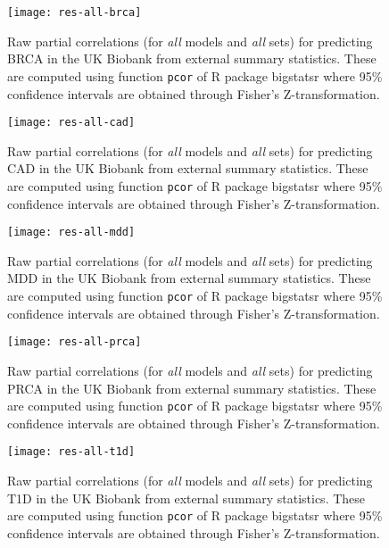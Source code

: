 \begin{figure}[p]
	\centerline{\texttt{[image: res-all-brca]}}
	\caption{Raw partial correlations (for \textit{all} models and \textit{all} sets) for predicting BRCA in the UK Biobank from external summary statistics. These are computed using function \texttt{pcor} of R package bigstatsr where 95\% confidence intervals are obtained through Fisher's Z-transformation.}
	\label{fig:res_brca_all}
\end{figure}

\begin{figure}[p]
	\centerline{\texttt{[image: res-all-cad]}}
	\caption{Raw partial correlations (for \textit{all} models and \textit{all} sets) for predicting CAD in the UK Biobank from external summary statistics. These are computed using function \texttt{pcor} of R package bigstatsr where 95\% confidence intervals are obtained through Fisher's Z-transformation.}
	\label{fig:res_cad_all}
\end{figure}

\begin{figure}[p]
	\centerline{\texttt{[image: res-all-mdd]}}
	\caption{Raw partial correlations (for \textit{all} models and \textit{all} sets) for predicting MDD in the UK Biobank from external summary statistics. These are computed using function \texttt{pcor} of R package bigstatsr where 95\% confidence intervals are obtained through Fisher's Z-transformation.}
	\label{fig:res_mdd_all}
\end{figure}

\begin{figure}[p]
	\centerline{\texttt{[image: res-all-prca]}}
	\caption{Raw partial correlations (for \textit{all} models and \textit{all} sets) for predicting PRCA in the UK Biobank from external summary statistics. These are computed using function \texttt{pcor} of R package bigstatsr where 95\% confidence intervals are obtained through Fisher's Z-transformation.}
	\label{fig:res_prca_all}
\end{figure}

\begin{figure}[p]
	\centerline{\texttt{[image: res-all-t1d]}}
	\caption{Raw partial correlations (for \textit{all} models and \textit{all} sets) for predicting T1D in the UK Biobank from external summary statistics. These are computed using function \texttt{pcor} of R package bigstatsr where 95\% confidence intervals are obtained through Fisher's Z-transformation.}
	\label{fig:res_t1d_all}
\end{figure}
